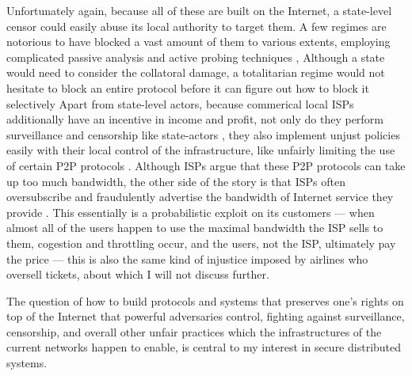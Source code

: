 \documentclass{article}
\begin{document}
Unfortunately again, because all of these are built on the Internet, a
state-level censor could easily abuse its local authority to target them. A few
regimes are notorious to have blocked a vast amount of them to various
extents, employing complicated passive analysis and active probing techniques
\cite{censor.block.1, censor.block.2,censor.block.3, censor.block.4,
censor.block.5,censor.block.6},
Although a state would need to consider the collatoral damage, a totalitarian
regime would not hesitate to block an entire protocol before it can figure out
how to block it selectively \cite{selective.block.1, censor.block.4} 
Apart from state-level actors, because commerical local ISPs additionally
have an incentive in income and profit, not only do they perform surveillance
and censorship like state-actors \cite{isp.statelike.actions.1,
isp.statelike.actions.2}, they also implement unjust policies easily with their
local control of the infrastructure, like unfairly limiting the use of certain
P2P protocols \cite{isp.block.p2p.1, isp.block.p2p.2, isp.block.p2p.3,
isp.statelike.actions.1}.  Although ISPs argue that these P2P protocols can
take up too much bandwidth, the other side of the story is that ISPs often
oversubscribe and fraudulently advertise the bandwidth of Internet service they
provide \cite{isp.oversubscribe.1, isp.oversubscribe.2}. This essentially is a
probabilistic exploit on its customers --- when almost all of the users happen
to use the maximal bandwidth the ISP sells to them, cogestion and throttling
occur, and the users, not the ISP, ultimately pay the price --- this is also
the same kind of injustice imposed by airlines who oversell tickets, about
which I will not discuss further.

The question of how to build protocols and systems that preserves one's rights
on top of the Internet that powerful adversaries control, fighting against
surveillance, censorship, and overall other unfair practices which the
infrastructures of the current networks happen to enable, is central to my
interest in secure distributed systems.
\end{document}
